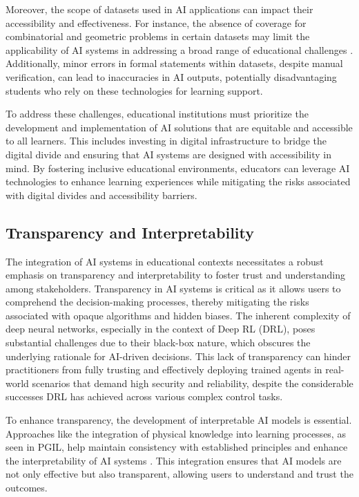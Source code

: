 Moreover, the scope of datasets used in AI applications can impact their accessibility and effectiveness. For instance, the absence of coverage for combinatorial and geometric problems in certain datasets may limit the applicability of AI systems in addressing a broad range of educational challenges \cite{liu2023fimochallengeformaldataset}. Additionally, minor errors in formal statements within datasets, despite manual verification, can lead to inaccuracies in AI outputs, potentially disadvantaging students who rely on these technologies for learning support.



To address these challenges, educational institutions must prioritize the development and implementation of AI solutions that are equitable and accessible to all learners. This includes investing in digital infrastructure to bridge the digital divide and ensuring that AI systems are designed with accessibility in mind. By fostering inclusive educational environments, educators can leverage AI technologies to enhance learning experiences while mitigating the risks associated with digital divides and accessibility barriers.



\subsection{Transparency and Interpretability} \label{subsec:Transparency and Interpretability}



The integration of AI systems in educational contexts necessitates a robust emphasis on transparency and interpretability to foster trust and understanding among stakeholders. Transparency in AI systems is critical as it allows users to comprehend the decision-making processes, thereby mitigating the risks associated with opaque algorithms and hidden biases. The inherent complexity of deep neural networks, especially in the context of Deep RL (DRL), poses substantial challenges due to their black-box nature, which obscures the underlying rationale for AI-driven decisions. This lack of transparency can hinder practitioners from fully trusting and effectively deploying trained agents in real-world scenarios that demand high security and reliability, despite the considerable successes DRL has achieved across various complex control tasks. \cite{qing2023surveyexplainablereinforcementlearning}



To enhance transparency, the development of interpretable AI models is essential. Approaches like the integration of physical knowledge into learning processes, as seen in PGIL, help maintain consistency with established principles and enhance the interpretability of AI systems \cite{huang2022physicallyexplainablecnnsar}. This integration ensures that AI models are not only effective but also transparent, allowing users to understand and trust the outcomes.



